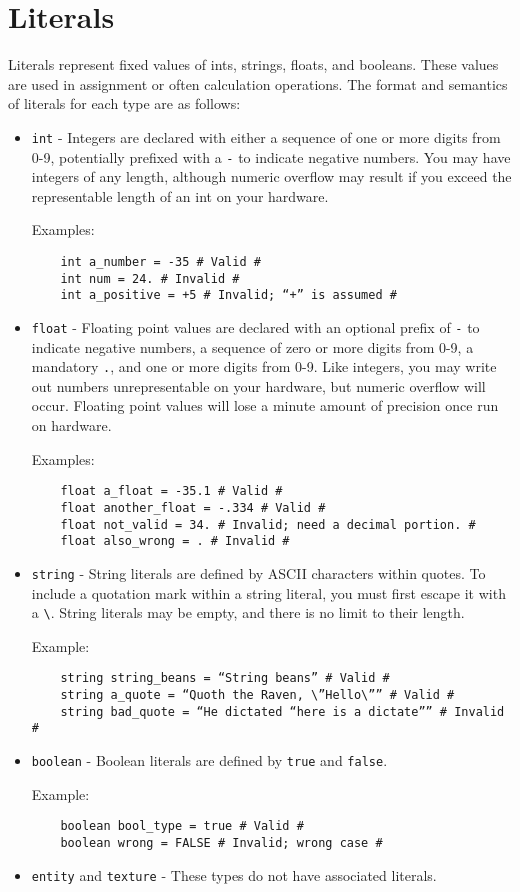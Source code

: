 \documentclass[titlepage]{article}
\begin{document}
\section{Literals}
Literals represent fixed values of ints, strings, floats, and booleans. These values are used in assignment or often calculation operations. The format and semantics of literals for each type are as follows:
\begin{itemize}
\item \verb|int| - Integers are declared with either a sequence of one or more digits from 0-9,  potentially prefixed with a \verb|-| to indicate negative numbers. You may have integers of any length, although numeric overflow may result if you exceed the representable length of an int on your hardware.

Examples:
\begin{verbatim}
    int a_number = -35 # Valid #
    int num = 24. # Invalid #
    int a_positive = +5 # Invalid; “+” is assumed #
\end{verbatim}

\item \verb|float| - Floating point values are declared with an optional prefix of \verb|-| to indicate negative numbers, a sequence of zero or more digits from 0-9, a mandatory \verb|.|, and one or more digits from 0-9. Like integers, you may write out numbers unrepresentable on your hardware, but numeric overflow will occur. Floating point values will lose a minute amount of precision once run on hardware.

Examples:
\begin{verbatim}
    float a_float = -35.1 # Valid #
    float another_float = -.334 # Valid #
    float not_valid = 34. # Invalid; need a decimal portion. #
    float also_wrong = . # Invalid #
\end{verbatim}

\item \verb|string| - String literals are defined by ASCII characters within quotes. To include a quotation mark within a string literal, you must first escape it with a \verb|\|. String literals may be empty, and there is no limit to their length.

Example:
\begin{verbatim}
    string string_beans = “String beans” # Valid #
    string a_quote = “Quoth the Raven, \”Hello\”” # Valid #
    string bad_quote = “He dictated “here is a dictate”” # Invalid #
\end{verbatim}

\item \verb|boolean| - Boolean literals are defined by \verb|true| and \verb|false|. 

Example:
\begin{verbatim}
    boolean bool_type = true # Valid #
    boolean wrong = FALSE # Invalid; wrong case #
\end{verbatim}

\item \verb|entity| and \verb|texture| - These types do not have associated literals.
\end{itemize}
\end{document}
